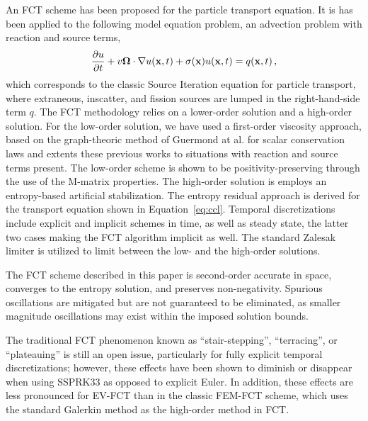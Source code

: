 An FCT scheme has been proposed for the particle transport equation. It is has been applied
to the following model equation problem, an advection problem with reaction and source terms,
\begin{equation} \label{eq:ccl}
  \frac{\partial u}{\partial t} + v\mathbf{\Omega}\cdot\nabla u(\mathbf{x},t) + \sigma(\mathbf{x}) u(\mathbf{x},t) = q(\mathbf{x},t) \,,
\end{equation}
which corresponds to the classic Source Iteration equation for particle transport,
where extraneous, inscatter, and fission sources are lumped in the right-hand-side term $q$.
%
The FCT methodology relies on a lower-order solution and a high-order solution. For the low-order
solution, we have used a first-order viscosity approach, based on the graph-theoric method of
Guermond at al. \cite{guermond_firstorder} for scalar conservation laws and extents these
previous works to situations with reaction and source terms present. The low-order scheme is shown
to be positivity-preserving through the use of the M-matrix properties. The high-order solution
is employs an entropy-based artificial stabilization. The entropy residual approach is derived
for the transport equation shown in Equation~\eqref{eq:ccl}.
Temporal discretizations include explicit and implicit schemes in time, as well as steady state,
the latter two cases making the FCT algorithm implicit as well. The standard Zalesak limiter is utilized
to limit between the low- and the high-order solutions.

The FCT scheme described in this paper is second-order accurate in space,
converges to the entropy solution, and preserves non-negativity.
Spurious oscillations are mitigated but are not guaranteed to be
eliminated, as smaller magnitude oscillations may exist within the imposed
solution bounds.


The traditional FCT phenomenon known as ``stair-stepping'',
``terracing'', or ``plateauing'' is still an open issue, particularly for
fully explicit temporal discretizations; however, these effects
have been shown to diminish or disappear when using SSPRK33 as opposed
to explicit Euler. In addition, these effects are less pronounced for EV-FCT
than in the classic FEM-FCT scheme, which uses the standard Galerkin method as
the high-order method in FCT.

